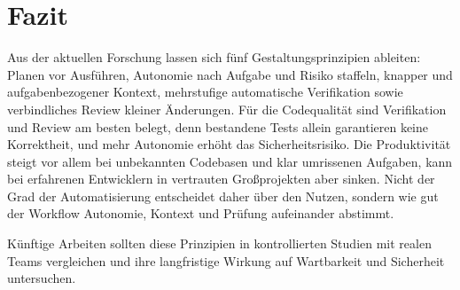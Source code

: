 \section{Fazit}
\label{sec:fazit}

Aus der aktuellen Forschung lassen sich fünf Gestaltungsprinzipien ableiten: Planen vor Ausführen, Autonomie nach Aufgabe und Risiko staffeln, knapper und aufgabenbezogener Kontext, mehrstufige automatische Verifikation sowie verbindliches Review kleiner Änderungen. Für die Codequalität sind Verifikation und Review am besten belegt, denn bestandene Tests allein garantieren keine Korrektheit, und mehr Autonomie erhöht das Sicherheitsrisiko. Die Produktivität steigt vor allem bei unbekannten Codebasen und klar umrissenen Aufgaben, kann bei erfahrenen Entwicklern in vertrauten Großprojekten aber sinken. Nicht der Grad der Automatisierung entscheidet daher über den Nutzen, sondern wie gut der Workflow Autonomie, Kontext und Prüfung aufeinander abstimmt.

Künftige Arbeiten sollten diese Prinzipien in kontrollierten Studien mit realen Teams vergleichen und ihre langfristige Wirkung auf Wartbarkeit und Sicherheit untersuchen.
